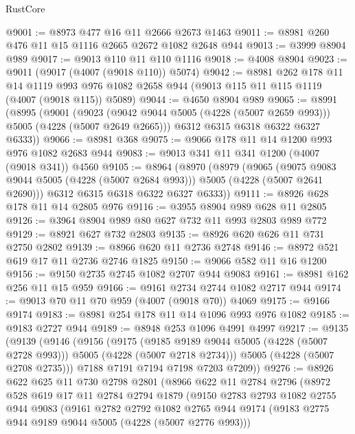 \begin{lexlean}{RustCore}
\begin{coremodule}
@9001 := @8973 @477 @16 @11 @2666 @2673 @1463
@9011 := @8981 @260 @476 @11 @15 @1116 @2665 @2672 @1082 @2648 @944
@9013 := @3999 @8904 @989
@9017 := @9013 @110 @11 @110 @1116
@9018 := @4008 @8904
@9023 := @9011 (@9017 (@4007 (@9018 @110)) @5074)
@9042 := @8981
    @262
    @178
    @11
    @14
    @1119
    @993
    @976
    @1082
    @2658
    @944
    (@9013 @115 @11 @115 @1119 (@4007 (@9018 @115)) @5089)
@9044 := @4650 @8904 @989
@9065 := @8991
    (@8995
      (@9001
        (@9023 (@9042 @9044 @5005 (@4228 (@5007 @2659 @993))) @5005 (@4228 (@5007 @2649 @2665)))
        @6312
        @6315
        @6318
        @6322
        @6327
        @6333))
@9066 := @8981 @368
@9075 := @9066 @178 @11 @14 @1200 @993 @976 @1082 @2683 @944
@9083 := @9013 @341 @11 @341 @1200 (@4007 (@9018 @341)) @4560
@9105 := @8964
    (@8970
      (@8979
        (@9065
          (@9075 @9083 @9044 @5005 (@4228 (@5007 @2684 @993)))
          @5005
          (@4228 (@5007 @2641 @2690)))
        @6312
        @6315
        @6318
        @6322
        @6327
        @6333))
@9111 := @8926 @628 @178 @11 @14 @2805 @976
@9116 := @3955 @8904 @989 @628 @11 @2805
@9126 := @3964 @8904 @989 @80 @627 @732 @11 @993 @2803 @989 @772
@9129 := @8921 @627 @732 @2803
@9135 := @8926 @620 @626 @11 @731 @2750 @2802
@9139 := @8966 @620 @11 @2736 @2748
@9146 := @8972 @521 @619 @17 @11 @2736 @2746 @1825
@9150 := @9066 @582 @11 @16 @1200
@9156 := @9150 @2735 @2745 @1082 @2707 @944 @9083
@9161 := @8981 @162 @256 @11 @15 @959
@9166 := @9161 @2734 @2744 @1082 @2717 @944
@9174 := @9013 @70 @11 @70 @959 (@4007 (@9018 @70)) @4069
@9175 := @9166 @9174
@9183 := @8981 @254 @178 @11 @14 @1096 @993 @976 @1082
@9185 := @9183 @2727 @944
@9189 := @8948 @253 @1096 @4991 @4997
@9217 := @9135
    (@9139
      (@9146
        (@9156
          (@9175
            (@9185 @9189 @9044 @5005 (@4228 (@5007 @2728 @993)))
            @5005
            (@4228 (@5007 @2718 @2734)))
          @5005
          (@4228 (@5007 @2708 @2735)))
        @7188
        @7191
        @7194
        @7198
        @7203
        @7209))
@9276 := @8926
    @622
    @625
    @11
    @730
    @2798
    @2801
    (@8966
      @622
      @11
      @2784
      @2796
      (@8972
        @528
        @619
        @17
        @11
        @2784
        @2794
        @1879
        (@9150
          @2783
          @2793
          @1082
          @2755
          @944
          @9083
          (@9161
            @2782
            @2792
            @1082
            @2765
            @944
            @9174
            (@9183 @2775 @944 @9189 @9044 @5005 (@4228 (@5007 @2776 @993)))

\end{coremodule}
\end{lexlean}
